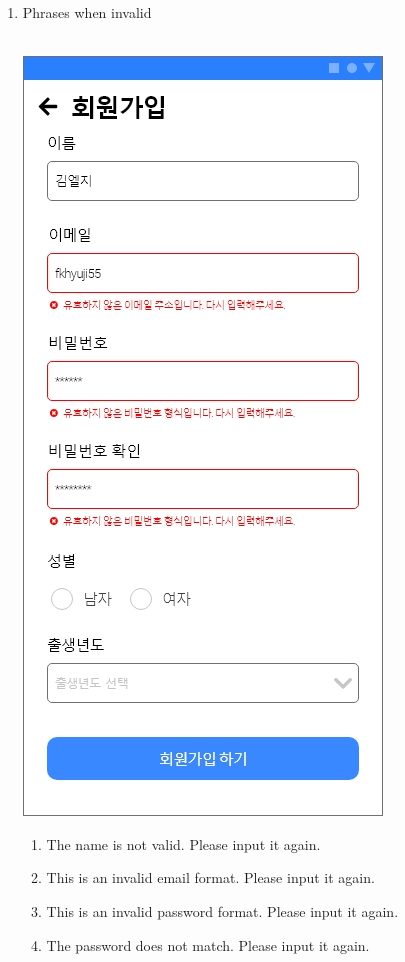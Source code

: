 \documentclass[conference]{IEEEtran}
\begin{document}
\begin{enumerate}
\begin{itemize}
          \begin{enumerate} 
          \item Phrases when invalid \\ \\
            \centerline{\includegraphics[scale=0.28]{회원가입3.jpg}}
          \begin{enumerate}
          \item The name is not valid. Please input it again.
          \item This is an invalid email format. Please input it again.
          \item This is an invalid password format. Please input it again.
          \item The password does not match. Please input it again.
        \end{enumerate}

\end{enumerate}
\end{itemize}
\end{enumerate}
\end{document}
